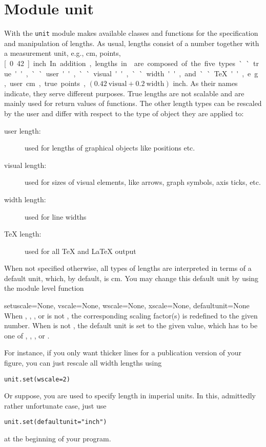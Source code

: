 \chapter{Module unit}
\label{unit}



With the \verb|unit| module \PyX{} makes available classes and
functions for the specification and manipulation of lengths. As usual,
lengths consist of a number together with a measurement unit, e.g.,
\unit[1]{cm}, \unit[50]{points}, \unit[0.42]{inch}.  In addition,
lengths in \PyX{} are composed of the five types ``true'', ``user'',
``visual'', ``width'', and ``\TeX'', e.g., \unit[1]{user cm},
\unit[50]{true points}, $(0.42\ \mathrm{visual} + 0.2\ 
\mathrm{width})$ inch.  As their names indicate, they serve different
purposes. True lengths are not scalable and are mainly used for return
values of \PyX{} functions.  The other length types can be rescaled by
the user and differ with respect to the type of object they are
applied to:

\begin{description}
\item[user length:] used for lengths of graphical objects like
  positions etc.
\item[visual length:] used for sizes of visual elements, like arrows,
  graph symbols, axis ticks, etc.
\item[width length:] used for line widths
\item[\TeX{} length:] used for all \TeX{} and \LaTeX{} output
\end{description}

    When not specified otherwise, all types of lengths are interpreted
in terms of a default unit, which, by default, is \unit[1]{cm}.
You may change this default unit by using the module level function
\begin{funcdesc}{set}{uscale=None, vscale=None, wscale=None,
xscale=None, defaultunit=None}
When , , , or  is not
, the corresponding scaling factor(s) is redefined to
the given number. When \var{defaultunit} is not \keyword{None}, 
the default unit is set to the given value, which has to be
one of , , , or .
\end{funcdesc}

For instance, if you only want thicker lines for a publication
version of your figure, you can just rescale all width lengths using
\begin{verbatim}
unit.set(wscale=2)
\end{verbatim}
Or suppose, you are used to specify length in imperial units. In this,
admittedly rather unfortunate case, just use
\begin{verbatim}
unit.set(defaultunit="inch")
\end{verbatim}
at the beginning of your program.

